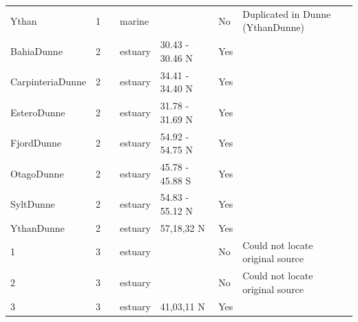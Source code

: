\documentclass[12pt]{article}
\begin{document}
\begin{landscape}
\begin{table}[h!]
{\begin{tabular}{p{2.8cm}p{1.3cm}p{5.5cm}p{2.2cm}p{2.5cm}lp{3.5cm}}
        Ythan & 1 & \citet{Huxham1996}     & marine &       & No    & Duplicated in Dunne (YthanDunne) \\
        BahiaDunne & 2 & \citet{Hechinger2011}  & estuary & 30.43 - 30.46 N & Yes   &        \\
        CarpinteriaDunne & 2 & \citet{Hechinger2011}    & estuary & 34.41 - 34.40 N & Yes   &        \\
        EsteroDunne & 2 & \citet{Hechinger2011}  & estuary & 31.78 - 31.69 N & Yes   &        \\
        FjordDunne & 2 & \citet{Zander2011}  & estuary & 54.92 - 54.75 N & Yes   &        \\
        OtagoDunne & 2 & \citet{Mouritsen2011}  & estuary & 45.78 - 45.88 S & Yes   &        \\
        SyltDunne & 2 & \citet{Thieltges2011}  & estuary & 54.83 - 55.12 N & Yes   &        \\
        YthanDunne & 2 & \citet{Huxham1996}  & estuary & 57,18,32 N & Yes   &        \\
        1     & 3 & \citet{Qazim1970}  & estuary &       & No    & Could not locate original source \\
        2     & 3 & \citet{Day1967} & estuary &       & No    & Could not locate original source \\
        3     & 3 & \citet{Woodwell1967}    & estuary & 41,03,11 N & Yes   &       \\
        \hline
      \end{tabular}}%
      \end{table}

        \newpage


\end{landscape}
\end{document}
